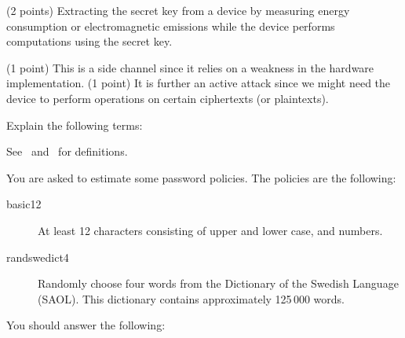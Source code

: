 \documentclass[svv,addpoints]{miunexam}
\begin{document}
\begin{questions}
\begin{solution}
  (2 points) Extracting the secret key from a device by measuring energy 
  consumption or electromagnetic emissions while the device performs 
  computations using the secret key.

  (1 point) This is a side channel since it relies on a weakness in the 
  hardware implementation.
  (1 point) It is further an active attack since we might need the device to 
  perform operations on certain ciphertexts (or plaintexts).
\end{solution}


%
\question\label{q:crypto:foundations:E}
  Explain the following terms:

  \begin{solution}
    See~\cite{Gollmann2011cs} and~\cite{Anderson2008sea} for definitions.
  \end{solution}


  
\question\label{q:passwd:infotheory:E:C:A}
  You are asked to estimate some password policies.
  The policies are the following:
  \begin{description}
    \item[basic12]
      At least 12 characters consisting of upper and lower case, and numbers.
    \item[randswedict4]
      Randomly choose four words from the Dictionary of the Swedish Language 
      (SAOL).
      This dictionary contains approximately 125\,000 words.
  \end{description}
  You should answer the following:
  \begin{parts}

\end{parts}
\end{questions}
\end{document}
